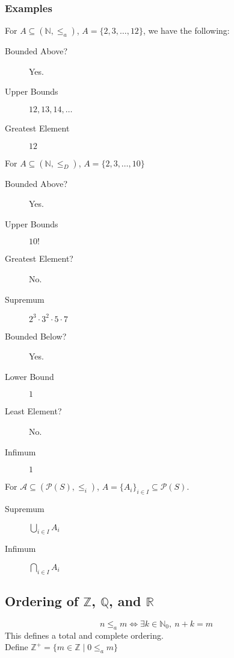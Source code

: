 \documentclass[10pt]{extarticle}
\newcommand{\N}{\mathbb{N}}
\newcommand{\Q}{\mathbb{Q}}
\newcommand{\Z}{\mathbb{Z}}
\newcommand{\R}{\mathbb{R}}
\begin{document}
        \subsubsection{Examples}%
          For $A\subseteq (\N,\leq_a)$, $A = \{2,3,\dots,12\}$, we have the following:
          \begin{description}
            \item[Bounded Above?] Yes.
            \item[Upper Bounds] $12,13,14,\dots$
            \item[Greatest Element] $12$
          \end{description}
          For $A\subseteq (\N,\leq_D)$, $A = \{2,3,\dots,10\}$
          \begin{description}
            \item[Bounded Above?] Yes.
            \item[Upper Bounds] $10!$
            \item[Greatest Element?] No.
            \item[Supremum] $2^3\cdot3^2\cdot5\cdot7$
            \item[Bounded Below?] Yes.
            \item[Lower Bound] $1$
            \item[Least Element?] No.
            \item[Infimum] $1$
          \end{description}
          For $\mathcal{A}\subseteq (\mathcal{P}(S),\leq_i)$, $A = \{A_i\}_{i\in I} \subseteq \mathcal{P}(S)$.
          \begin{description}
            \item[Supremum] $\bigcup_{i\in I}A_i$
            \item[Infimum] $\bigcap_{i\in I}A_i$
          \end{description}
    \subsection{Ordering of $\Z$, $\Q$, and $\R$}%
    
    \[
      n\leq_a m \Leftrightarrow \exists k\in \N_0,~n+k=m
    \] 
    This defines a total and complete ordering.\\

    Define $\Z^+ = \{m\in \Z\mid 0\leq_a m\}$\\
\end{document}

